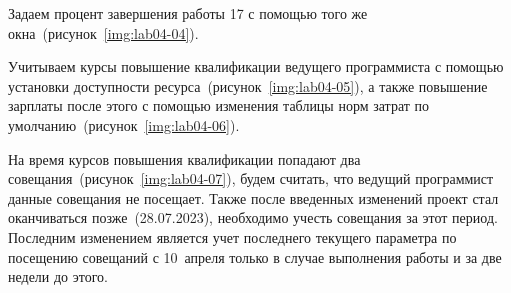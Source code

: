 
Задаем процент завершения работы 17 с помощью того же окна~(рисунок~\ref{img:lab04-04}).


Учитываем курсы повышение квалификации ведущего программиста с помощью
установки доступности ресурса~(рисунок~\ref{img:lab04-05}), а также повышение
зарплаты после этого с помощью изменения таблицы норм затрат по
умолчанию~(рисунок~\ref{img:lab04-06}).



На время курсов повышения квалификации попадают два
совещания~(рисунок~\ref{img:lab04-07}), будем считать, что ведущий программист
данные совещания не посещает. Также после введенных изменений проект стал
оканчиваться позже~(28.07.2023), необходимо учесть совещания за этот период.
Последним изменением является учет последнего текущего параметра по посещению
совещаний с 10~апреля только в случае выполнения работы и за две недели до
этого.

